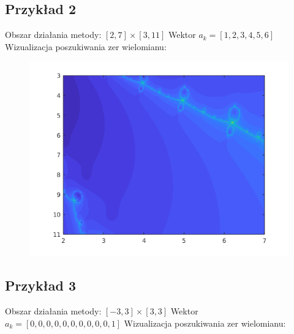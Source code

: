 \documentclass[10pt]{article}   %
\begin{document}
\subsection{Przykład 2}
Obszar działania metody: $[2,7]\times[3,11]$\newline
Wektor $a_k=[1,2,3,4,5,6]$\newline
Wizualizacja poszukiwania zer wielomianu:\newline

\begin{figure}[ht]
\begin{center}
\advance\leftskip-3cm
\advance\rightskip-3cm
\includegraphics[keepaspectratio=true,scale=0.8]{map3.png}\newline
\end{center}\end{figure}
\newpage

\subsection{Przykład 3}
Obszar działania metody: $[-3,3]\times[3,3]$\newline
Wektor $a_k=[0,0,0,0,0,0,0,0,0,0,1]$\newline
Wizualizacja poszukiwania zer wielomianu:\newline
\end{document}
